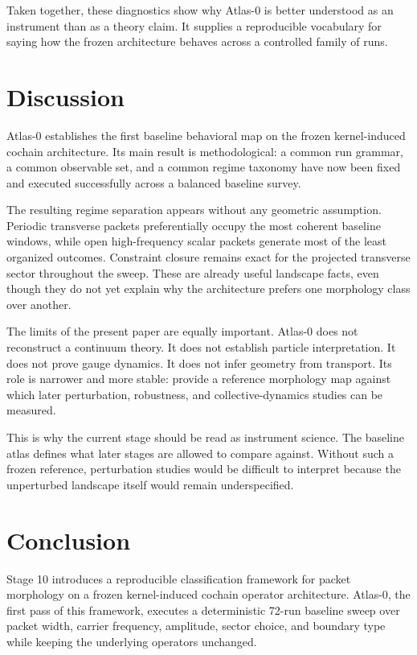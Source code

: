 \documentclass[11pt]{article}
\begin{document}
Taken together, these diagnostics show why Atlas-0 is better understood as an instrument than as a theory claim. It supplies a reproducible vocabulary for saying how the frozen architecture behaves across a controlled family of runs.

\section{Discussion}
Atlas-0 establishes the first baseline behavioral map on the frozen kernel-induced cochain architecture. Its main result is methodological: a common run grammar, a common observable set, and a common regime taxonomy have now been fixed and executed successfully across a balanced baseline survey.

The resulting regime separation appears without any geometric assumption. Periodic transverse packets preferentially occupy the most coherent baseline windows, while open high-frequency scalar packets generate most of the least organized outcomes. Constraint closure remains exact for the projected transverse sector throughout the sweep. These are already useful landscape facts, even though they do not yet explain why the architecture prefers one morphology class over another.

The limits of the present paper are equally important. Atlas-0 does not reconstruct a continuum theory. It does not establish particle interpretation. It does not prove gauge dynamics. It does not infer geometry from transport. Its role is narrower and more stable: provide a reference morphology map against which later perturbation, robustness, and collective-dynamics studies can be measured.

This is why the current stage should be read as instrument science. The baseline atlas defines what later stages are allowed to compare against. Without such a frozen reference, perturbation studies would be difficult to interpret because the unperturbed landscape itself would remain underspecified.

\section{Conclusion}
Stage 10 introduces a reproducible classification framework for packet morphology on a frozen kernel-induced cochain operator architecture. Atlas-0, the first pass of this framework, executes a deterministic 72-run baseline sweep over packet width, carrier frequency, amplitude, sector choice, and boundary type while keeping the underlying operators unchanged.
\end{document}
